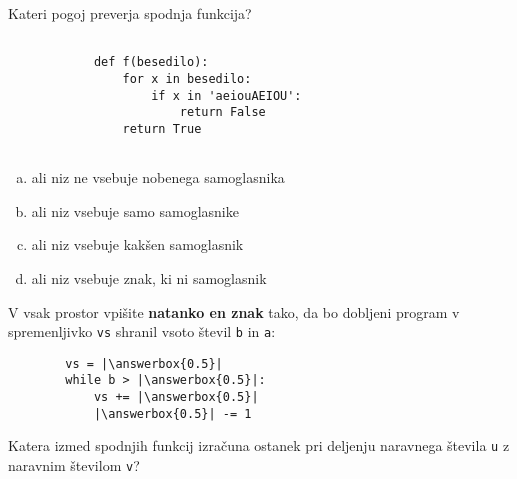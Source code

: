 \documentclass[arhiv, 10pt]{../izpit}
\newcommand{\inlinepy}[1]{\texttt{#1}}
\newcommand{\answerbox}[1]{\framebox{\vphantom{\large M}\hspace{#1cm}}}
\begin{document}
        \naloga*

        \begin{multicols}{2}
        \noindent
        Kateri pogoj preverja spodnja funkcija?
        \begin{verbatim}
        
            def f(besedilo):
                for x in besedilo:
                    if x in 'aeiouAEIOU':
                        return False
                return True
            
        \end{verbatim}

        \begin{enumerate}[(a)]
\item ali niz ne vsebuje nobenega samoglasnika
\item ali niz vsebuje samo samoglasnike
\item ali niz vsebuje kakšen samoglasnik
\item ali niz vsebuje znak, ki ni samoglasnik
\end{enumerate}

        \end{multicols}
    
        \naloga*
        \begin{multicols}{2}
        \noindent
        V vsak prostor vpišite \textbf{natanko en znak} tako, da bo dobljeni program v spremenljivko \inlinepy{vs} shranil vsoto števil \inlinepy{b} in \inlinepy{a}:
        
        \columnbreak
        \begin{verbatim}
        vs = |\answerbox{0.5}|
        while b > |\answerbox{0.5}|:
            vs += |\answerbox{0.5}|
            |\answerbox{0.5}| -= 1
        \end{verbatim}
        \end{multicols}
    
        \clearpage
        \naloga
        
        Katera izmed spodnjih funkcij izračuna ostanek pri deljenju naravnega števila \inlinepy{u} z naravnim številom \inlinepy{v}?
    
\end{document}
